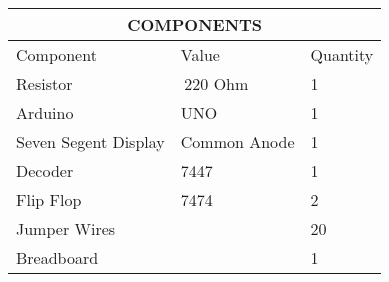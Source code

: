 \begin{tabular}{|p{5cm}|p{3cm}|p{2cm}|}
\hline
\multicolumn{3}{|c|}{COMPONENTS}\\
\hline
Component& Value& Quantity\\
\hline
Resistor& $\>$220 Ohm& 1\\
\hline
Arduino& UNO& 1\\
\hline
Seven Segent Display& Common Anode& 1\\
\hline
Decoder& 7447& 1\\
\hline
Flip Flop& 7474& 2\\
\hline
Jumper Wires&  & 20\\
\hline
Breadboard&  & 1\\
\hline
\end{tabular}
